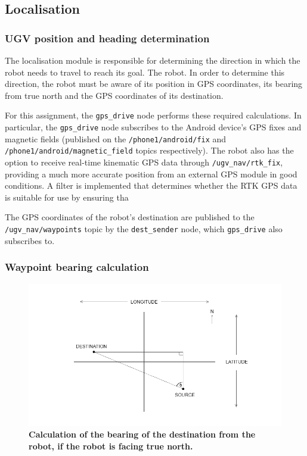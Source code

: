 \documentclass[titlepage,12pt,a4paper]{article}
\begin{document}
\subsection{Localisation}

\subsubsection{UGV position and heading determination}
The localisation module is responsible for determining the direction in which the robot needs to travel to reach its goal. The robot. In order to determine this direction, the robot must be aware of its position in GPS coordinates, its bearing from true north and the GPS coordinates of its destination.

For this assignment, the \verb|gps_drive| node performs these required calculations. In particular, the \verb|gps_drive| node subscribes to the Android device's GPS fixes and magnetic fields (published on the \verb|/phone1/android/fix| and \verb|/phone1/android/magnetic_field| topics respectively). The robot also has the option to receive real-time kinematic GPS data through \verb|/ugv_nav/rtk_fix|, providing a much more accurate position from an external GPS module in good conditions. A filter is implemented that determines whether the RTK GPS data is suitable for use by ensuring tha

The GPS coordinates of the robot's destination are published to the  \verb|/ugv_nav/waypoints| topic by the \verb|dest_sender| node, which \verb|gps_drive| also subscribes to.

\subsubsection{Waypoint bearing calculation}
\begin{figure}[h]
	\centering
	\includegraphics[scale=0.6]{figures/bearings.png}
	\caption{\textbf{Calculation of the bearing of the destination from the robot, if the robot is facing true north.}}
	\label{figure:bearing1}
\end{figure}
\end{document}
